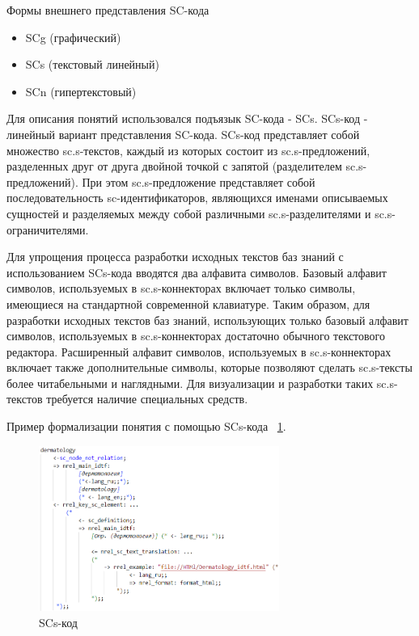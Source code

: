 Формы внешнего представления SC-кода
\begin{itemize}
	\item {SCg (графический)}
	\item {SCs (текстовый линейный)}
	\item {SCn (гипертекстовый)}
\end{itemize}


Для описания понятий использовался подъязык SC-кода - SCs.
SCs-код - линейный вариант представления SC-кода. SCs-код представляет собой множество sc.s-текстов, каждый из которых состоит из sc.s-предложений, разделенных друг от друга двойной точкой с запятой (разделителем sc.s-предложений). При этом sc.s-предложение представляет собой последовательность sc-идентификаторов, являющихся именами описываемых сущностей и разделяемых между собой различными sc.s-разделителями и sc.s-ограничителями. \cite{OSTIS}

Для упрощения процесса разработки исходных текстов баз знаний с использованием SCs-кода вводятся два алфавита символов. Базовый алфавит символов, используемых в sc.s-коннекторах включает только символы, имеющиеся на стандартной современной клавиатуре. Таким образом, для разработки исходных текстов баз знаний, использующих только базовый алфавит символов, используемых в sc.s-коннекторах достаточно обычного текстового редактора. Расширенный алфавит символов, используемых в sc.s-коннекторах включает также дополнительные символы, которые позволяют сделать sc.s-тексты более читабельными и наглядными. Для визуализации и разработки таких sc.s-текстов требуется наличие специальных средств.

Пример формализации понятия с помощью SCs-кода ~\ref{fig:sections/SCs}.
\begin{figure}[H]
	\centering
	\includegraphics[width=0.7\textwidth]{sections/scs_dermatology.png}
	\caption{SCs-код}
	\label{fig:sections/SCs}
\end{figure}


